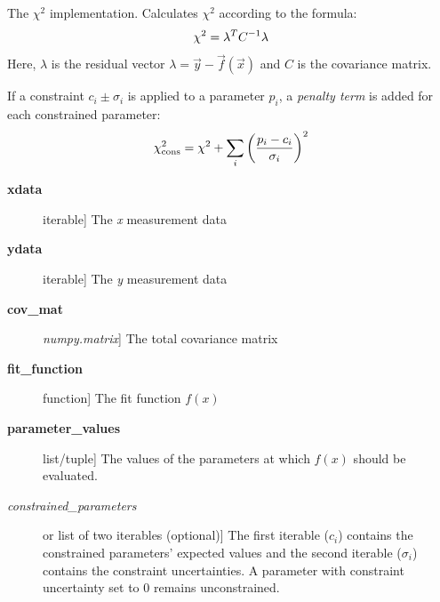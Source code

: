 \documentclass[a4paper,10pt,english]{sphinxmanual}
\begin{document}

\begin{fulllineitems}
\label{index:kafe.fit.chi2}
The $\chi^2$ implementation. Calculates $\chi^2$ according
to the formula:
\begin{gather}
\begin{split}\chi^2 = \lambda^T C^{-1} \lambda\end{split}\notag
\end{gather}
Here, $\lambda$ is the residual vector $\lambda = \vec{y} -
\vec{f}(\vec{x})$ and $C$ is the covariance matrix.

If a constraint $c_i\pm\sigma_i$ is applied to a parameter $p_i$,
a \emph{penalty term} is added for each constrained parameter:
\begin{gather}
\begin{split}\chi^2_{\text{cons}} = \chi^2 + \sum_i{ \left( \frac{p_i - c_i}{\sigma_i} \right)^2 }\end{split}\notag
\end{gather}\begin{description}
\item[{\textbf{xdata}}] \leavevmode{[}iterable{]}
The \emph{x} measurement data

\item[{\textbf{ydata}}] \leavevmode{[}iterable{]}
The \emph{y} measurement data

\item[{\textbf{cov\_mat}}] \leavevmode{[}\emph{numpy.matrix}{]}
The total covariance matrix

\item[{\textbf{fit\_function}}] \leavevmode{[}function{]}
The fit function $f(x)$

\item[{\textbf{parameter\_values}}] \leavevmode{[}list/tuple{]}
The values of the parameters at which $f(x)$ should be evaluated.

\item[{\emph{constrained\_parameters}}] \leavevmode{[} or list of two iterables (optional){]}
The first iterable (${c_i}$) contains the constrained parameters'
expected values and the second iterable (${\sigma_i}$) contains
the constraint uncertainties. A parameter with constraint uncertainty
set to 0 remains unconstrained.

\end{description}

\end{fulllineitems}
\end{document}
